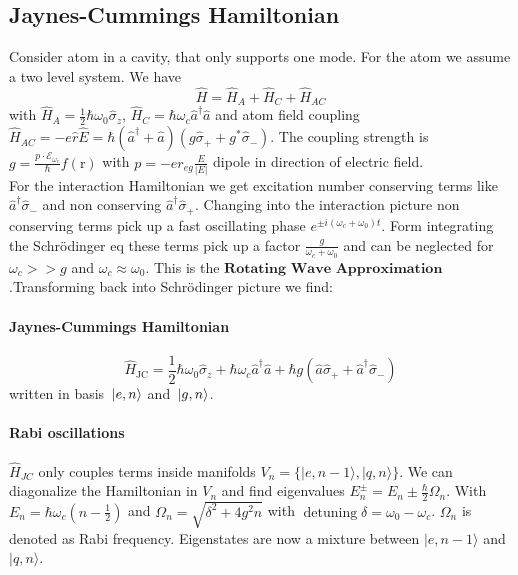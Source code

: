\subsection{Jaynes-Cummings Hamiltonian}

Consider atom in a cavity, that only supports one mode. For the atom we assume a two level system. We have 
$$\hat{H}=\hat{H}_A+\hat{H}_C+\hat{H}_{A C}$$
with $\hat{H}_A=\frac{1}{2} \hbar \omega_0 \hat{\sigma}_z$, $\hat{H}_C=\hbar \omega_c \hat{a}^{\dagger} \hat{a}$ and atom field coupling 
$\hat{H}_{A C}=-e \hat{r} \hat{E}=\hbar\left(\hat{a}^{\dagger}+\hat{a}\right)\left(g \hat{\sigma}_{+}+g^* \hat{\sigma}_{-}\right)$. The coupling 
strength is $g=\frac{p \cdot \mathcal{E}_{\omega_c}}{\hbar} f(\mathrm{r})$ with $p=-e r_{e g} \frac{E}{|E|}$ dipole in direction of electric field.\\

For the interaction Hamiltonian we get excitation number conserving terms like $\hat{a}^{\dagger} \hat{\sigma}_{-}$ and non conserving $\hat{a}^{\dagger} \hat{\sigma}_{+}$.
Changing into the interaction picture non conserving terms pick up a fast oscillating phase $e^{\pm i\left(\omega_c+\omega_0\right) t}$. Form integrating 
the Schrödinger eq these terms pick up a factor $\frac{g}{\omega_c+\omega_0}$ and can be neglected for $\omega_c >> g$ and $\omega_c \approx \omega_0$. 
This is the $\textbf{Rotating Wave Approximation}$.Transforming back into Schrödinger picture we find:

\paragraph{Jaynes-Cummings Hamiltonian} $$\hat{H}_{\mathrm{JC}}=\frac{1}{2} \hbar \omega_0 \hat{\sigma}_z+\hbar \omega_c \hat{a}^{\dagger} \hat{a}+\hbar g\left(\hat{a} \hat{\sigma}_{+}+\hat{a}^{\dagger} \hat{\sigma}_{-}\right)$$
written in basis $\ket*{e,n}$ and $\ket*{g,n}$.

\paragraph{Rabi oscillations} $\hat{H}_{JC}$ only couples terms inside manifolds $V_n = \{|e, n-1\rangle ,|q, n\rangle \}$. We can diagonalize the
Hamiltonian in $V_n$ and find eigenvalues $E_n^\pm = E_n \pm \frac{\hbar}{2} \Omega_n$. With $E_n= \hbar \omega_c\left(n-\frac{1}{2}\right)$  
and $\Omega_n = \sqrt{\delta^2+4 g^2 n}$ with $\operatorname{detuning} \delta=\omega_0-\omega_c$. $\Omega_n$ is denoted as Rabi frequency.
Eigenstates are now a mixture between $|e, n-1\rangle$ and $|q, n\rangle$. \\


